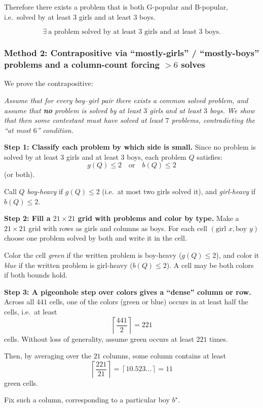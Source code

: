 \documentclass[12pt]{article}
\begin{document}
Therefore there exists a problem that is both G-popular and B-popular, i.e.\ solved by at least $3$ girls and at least $3$ boys.

\[
\boxed{\exists\ \text{a problem solved by at least }3\text{ girls and at least }3\text{ boys.}}
\]

\subsubsection{Method 2: Contrapositive via ``mostly-girls'' / ``mostly-boys'' problems and a column-count forcing $>6$ solves}
We prove the contrapositive:

\medskip
\noindent\emph{Assume that for every boy--girl pair there exists a common solved problem, and assume that \textbf{no} problem is solved by at least $3$ girls and at least $3$ boys. We show that then some contestant must have solved at least $7$ problems, contradicting the ``at most $6$'' condition.}

\medskip
\noindent\textbf{Step 1: Classify each problem by which side is small.}
Since no problem is solved by at least $3$ girls and at least $3$ boys, each problem $Q$ satisfies:
\[
g(Q)\le 2 \quad \text{or}\quad b(Q)\le 2
\]
(or both).

Call $Q$ \emph{boy-heavy} if $g(Q)\le 2$ (i.e.\ at most two girls solved it), and \emph{girl-heavy} if $b(Q)\le 2$.

\medskip
\noindent\textbf{Step 2: Fill a $21\times 21$ grid with problems and color by type.}
Make a $21\times 21$ grid with rows as girls and columns as boys. For each cell $(\text{girl }x,\text{boy }y)$ choose one problem solved by both and write it in the cell.

Color the cell \emph{green} if the written problem is boy-heavy ($g(Q)\le 2$), and color it \emph{blue} if the written problem is girl-heavy ($b(Q)\le 2$). A cell may be both colors if both bounds hold.

\medskip
\noindent\textbf{Step 3: A pigeonhole step over colors gives a ``dense'' column or row.}
Across all $441$ cells, one of the colors (green or blue) occurs in at least half the cells, i.e.\ at least
\[
\left\lceil \frac{441}{2}\right\rceil = 221
\]
cells. Without loss of generality, assume green occurs at least $221$ times.

Then, by averaging over the $21$ columns, some column contains at least
\[
\left\lceil \frac{221}{21}\right\rceil = \left\lceil 10.523\ldots \right\rceil = 11
\]
green cells.

Fix such a column, corresponding to a particular boy $b^\star$.
\end{document}
